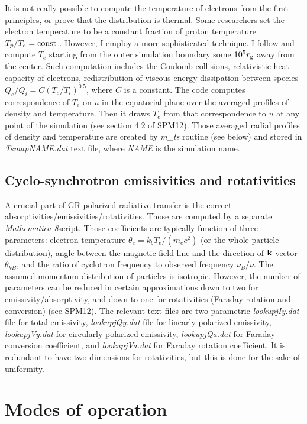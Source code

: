 \documentclass{emulateapj}
\newcommand{\mat}{\textit{Mathematica 8}}
\begin{document}
It is not really possible to compute the temperature of electrons from the first principles, or prove that the distribution is thermal.
Some researchers set the electron temperature to be a constant fraction of proton temperature $T_p/T_e=\rm const$ \citep{Moscibrodzka:2009,Dexter:2010lk}.
However, I employ a more sophisticated technique. I follow \citet{Sharma_heating:2007} and compute $T_e$ starting from the outer simulation boundary
some $10^5r_{\rm g}$ away from the center. Such computation includes the Coulomb collisions, relativistic heat capacity of electrons,
redistribution of viscous energy dissipation between species $Q_e/Q_i=C(T_e/T_i)^{0.5}$, where $C$ is a constant.
The code computes correspondence of $T_e$ on $u$ in the equatorial plane over the averaged profiles of density and temperature.
Then it draws $T_e$ from that correspondence to $u$ at any point of the simulation (see section 4.2 of SPM12).
Those averaged radial profiles of density and temperature are created by \textit{m\_ts} routine (see below) and stored in \textit{TsmapNAME.dat} text file,
where \textit{NAME} is the simulation name.

\subsection{Cyclo-synchrotron emissivities and rotativities}
A crucial part of GR polarized radiative transfer is the correct absorptivities/emissivities/rotativities.
Those are computed by a separate \mat script. Those coefficients are typically function of three parameters:
electron temperature $\theta_e=k_b T_e/(m_e c^2)$ (or the whole particle distribution), angle between the magnetic field line and the direction of ${\bf k}$ vector
$\theta_{kB}$, and the ratio of cyclotron frequency to observed frequency $\nu_B/\nu$. The assumed momentum distribution of particles is isotropic.
However, the number of parameters can be reduced in certain approximations down to two for emissivity/absorptivity, and down to one for rotativities
(Faraday rotation and conversion) (see SPM12). The relevant text files are two-parametric \textit{lookupjIy.dat} file for total emissivity,
\textit{lookupjQy.dat} file for linearly polarized emissivity, \textit{lookupjVy.dat} for circularly polarized emissivity, \textit{lookupjQa.dat}
for Faraday conversion coefficient, and \textit{lookupjVa.dat} for Faraday rotation coefficient. It is redundant to have two dimensions for rotativities,
but this is done for the sake of uniformity.

\section{Modes of operation}
\end{document}
